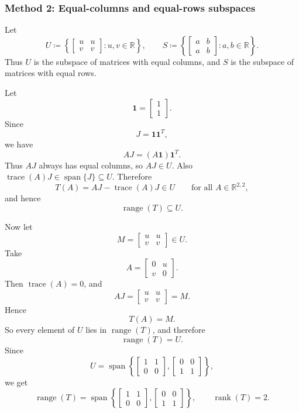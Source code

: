 \documentclass[12pt]{article}
\newcommand{\R}{\mathbb{R}}
\DeclareMathOperator{\Range}{range}
\DeclareMathOperator{\Rank}{rank}
\DeclareMathOperator{\tr}{trace}
\begin{document}
\newpage
\subsubsection{Method 2: Equal-columns and equal-rows subspaces}
Let
\[
U\coloneqq
\left\{
\begin{bmatrix}u&u\\v&v\end{bmatrix}:u,v\in\R
\right\},
\qquad
S\coloneqq
\left\{
\begin{bmatrix}a&b\\a&b\end{bmatrix}:a,b\in\R
\right\}.
\]
Thus \(U\) is the subspace of matrices with equal columns, and \(S\) is the subspace of matrices with equal rows.

Let
\[
\bm{1}=\begin{bmatrix}1\\1\end{bmatrix}.
\]
Since
\[
J=\bm{1}\bm{1}^{T},
\]
we have
\[
AJ=(A\bm{1})\bm{1}^{T}.
\]
Thus \(AJ\) always has equal columns, so \(AJ\in U\). Also \(\tr(A)J\in \operatorname{span}\{J\}\subseteq U\). Therefore
\[
T(A)=AJ-\tr(A)J\in U
\qquad\text{for all }A\in\R^{2,2},
\]
and hence
\[
\Range(T)\subseteq U.
\]

Now let
\[
M=\begin{bmatrix}u&u\\v&v\end{bmatrix}\in U.
\]
Take
\[
A=\begin{bmatrix}0&u\\v&0\end{bmatrix}.
\]
Then \(\tr(A)=0\), and
\[
AJ=
\begin{bmatrix}u&u\\v&v\end{bmatrix}=M.
\]
Hence
\[
T(A)=M.
\]
So every element of \(U\) lies in \(\Range(T)\), and therefore
\[
\Range(T)=U.
\]
Since
\[
U=\operatorname{span}\left\{
\begin{bmatrix}1&1\\0&0\end{bmatrix},
\begin{bmatrix}0&0\\1&1\end{bmatrix}
\right\},
\]
we get
\[
\boxed{
\Range(T)=
\operatorname{span}\left\{
\begin{bmatrix}1&1\\0&0\end{bmatrix},
\begin{bmatrix}0&0\\1&1\end{bmatrix}
\right\},
\qquad
\Rank(T)=2.}
\]
\end{document}
